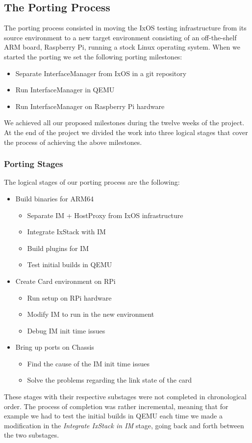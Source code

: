 \subsection{The Porting Process}

The porting process consisted in moving the IxOS testing infrastructure from its
source environment to a new target environment consisting of an off-the-shelf
ARM board, Raspberry Pi, running a stock Linux operating system. When we started
the porting we set the following porting milestones:
\begin{itemize}
    \item Separate InterfaceManager from IxOS in a git repository
    \item Run InterfaceManager in QEMU
    \item Run InterfaceManager on Raspberry Pi hardware
\end{itemize}
We achieved all our proposed milestones during the twelve weeks of the project.
At the end of the project we divided the work into three logical stages
that cover the process of achieving the above milestones.

\subsubsection{Porting Stages}

The logical stages of our porting process are the following:
\begin{itemize}
    \item Build binaries for ARM64
    \begin{itemize}
        \item Separate IM + HostProxy from IxOS infrastructure
        \item Integrate IxStack with IM
        \item Build plugins for IM
        \item Test initial builds in QEMU
    \end{itemize}
    \item Create Card environment on RPi
    \begin{itemize}
        \item Run setup on RPi hardware
        \item Modify IM to run in the new environment
        \item Debug IM init time issues
    \end{itemize}
    \item Bring up ports on Chassis
    \begin{itemize}
        \item Find the cause of the IM init time issues
        \item Solve the problems regarding the link state of the card
    \end{itemize}
\end{itemize}
These stages with their respective substages were not completed in chronological
order. The process of completion was rather incremental, meaning that for
example we had to test the initial builds in QEMU each time we made a
modification in the \textit{Integrate IxStack in IM} stage, going back and forth
between the two substages.

